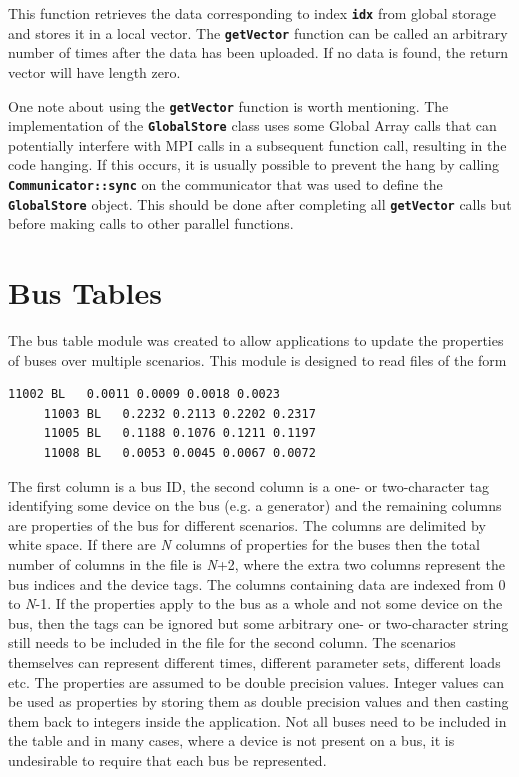 \documentclass[12pt]{report} %
\begin{document}
This function retrieves the data corresponding to index \texttt{\textbf{idx}} from global storage and stores it in a local vector. The \texttt{\textbf{getVector}} function can be called an arbitrary number of times after the data has been uploaded. If no data is found, the return vector will have length zero.

One note about using the \texttt{\textbf{getVector}} function is worth mentioning. The implementation of the \texttt{\textbf{GlobalStore}} class uses some Global Array calls that can potentially interfere with MPI calls in a subsequent function call, resulting in the code hanging. If this occurs, it is usually possible to prevent the hang by calling \texttt{\textbf{Communicator::sync}} on the communicator that was used to define the \texttt{\textbf{GlobalStore}} object. This should be done after completing all \texttt{\textbf{getVector}} calls but before making calls to other parallel functions.

\section{Bus Tables}

The bus table module was created to allow applications to update the properties of buses over multiple scenarios. This module is designed to read files of the form

{
\color{red}
\bfseries
\begin{Verbatim}[commandchars=\\\{\}]
     11002 BL   0.0011 0.0009 0.0018 0.0023
     11003 BL   0.2232 0.2113 0.2202 0.2317
     11005 BL   0.1188 0.1076 0.1211 0.1197
     11008 BL   0.0053 0.0045 0.0067 0.0072
\end{Verbatim}
}

The first column is a bus ID, the second column is a one- or two-character tag identifying some device on the bus (e.g. a generator) and the remaining columns are properties of the bus for different scenarios. The columns are delimited by white space. If there are \textit{N} columns of properties for the buses then the total number of columns in the file is \textit{N}+2, where the extra two columns represent the bus indices and the device tags. The columns containing data are indexed from 0 to \textit{N}-1. If the properties apply to the bus as a whole and not some device on the bus, then the tags can be ignored but some arbitrary one- or two-character string still needs to be included in the file for the second column. The scenarios themselves can represent different times, different parameter sets, different loads etc. The properties are assumed to be double precision values. Integer values can be used as properties by storing them as double precision values and then casting them back to integers inside the application. Not all buses need to be included in the table and in many cases, where a device is not present on a bus, it is undesirable to require that each bus be represented.
\end{document}
